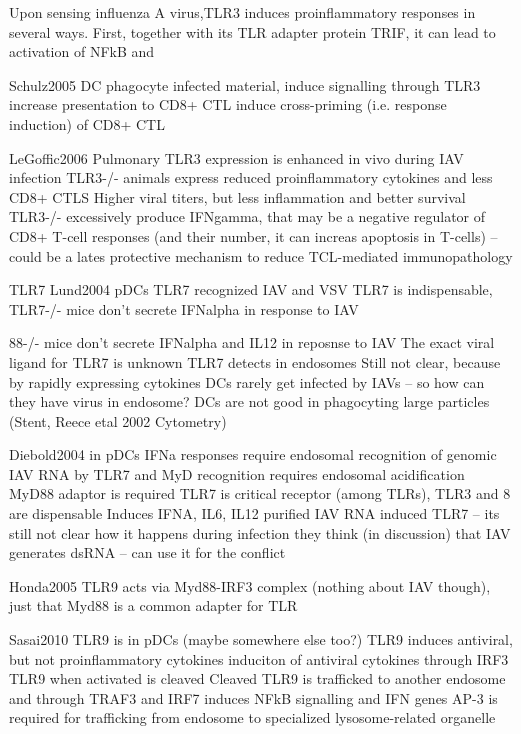 Upon sensing influenza A virus,TLR3 induces proinflammatory responses in several ways. First, together with its \gls{TLR} adapter protein TRIF, it can lead to activation of \gls{NFkB} and 
		
		
		Schulz2005
		DC phagocyte infected material, induce signalling through TLR3
		increase presentation to CD8+ CTL
		induce cross-priming (i.e. response induction) of CD8+ CTL
		
		LeGoffic2006
		Pulmonary TLR3 expression is enhanced in vivo during IAV infection
		TLR3-/- animals express reduced proinflammatory cytokines and less CD8+ CTLS
		Higher viral titers, but less inflammation and better survival 
		TLR3-/- excessively produce IFNgamma, that may be a negative regulator of CD8+ T-cell responses (and their number, it can increas apoptosis in T-cells) -- could be a lates protective mechanism to reduce TCL-mediated immunopathology
		
		TLR7
			Lund2004
				pDCs
				TLR7 recognized IAV and VSV
				TLR7 is indispensable, TLR7-/- mice don't secrete IFNalpha in response to IAV
				
				88-/- mice don't secrete IFNalpha and IL12 in reposnse to IAV 
				The exact viral ligand for TLR7 is unknown
				TLR7 detects in endosomes
				Still not clear, because by rapidly expressing cytokines DCs rarely get infected by IAVs -- so how can they have virus in endosome? DCs are not good in phagocyting large particles (Stent, Reece etal 2002 Cytometry)
				
				Diebold2004
				in pDCs
				IFNa responses require endosomal recognition of genomic IAV RNA by TLR7 and MyD
				recognition requires endosomal acidification
				MyD88 adaptor is required
				TLR7 is critical receptor (among TLRs), TLR3 and 8 are dispensable
				Induces IFNA, IL6, IL12
				purified IAV RNA induced TLR7 -- its still not clear how it happens during infection
				they think (in discussion) that IAV generates dsRNA -- can use it for the conflict
				
				Honda2005
				TLR9 acts via Myd88-IRF3 complex (nothing about IAV though), just that Myd88 is a common adapter for TLR
				
				Sasai2010
				TLR9 is in pDCs (maybe somewhere else too?)
				TLR9 induces antiviral, but not proinflammatory cytokines
				induciton of antiviral cytokines through IRF3
				TLR9 when activated is cleaved 
				Cleaved TLR9 is trafficked to another endosome and through TRAF3 and IRF7 induces NFkB signalling and IFN genes
				AP-3 is required for trafficking from endosome to specialized lysosome-related organelle
				
